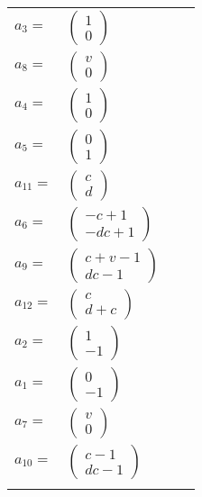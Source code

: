 \documentclass[1p]{elsarticle_modified}
\theoremstyle{definition}
\begin{document}
\begin{tabular}{m{7pt} m{180pt} m{7pt} m{180pt} }
\flushright $a_{3}=$&$\begin{pmatrix}1\\0\end{pmatrix}$ \\
\flushright $a_{8}=$&$\begin{pmatrix}v\\0\end{pmatrix}$ \\
\flushright $a_{4}=$&$\begin{pmatrix}1\\0\end{pmatrix}$ \\
\flushright $a_{5}=$&$\begin{pmatrix}0\\1\end{pmatrix}$ \\
\flushright $a_{11}=$&$\begin{pmatrix}c\\d\end{pmatrix}$ \\
\flushright $a_{6}=$&$\begin{pmatrix}- c+1\\- d c+1\end{pmatrix}$ \\
\flushright $a_{9}=$&$\begin{pmatrix}c+v-1\\d c-1\end{pmatrix}$ \\
\flushright $a_{12}=$&$\begin{pmatrix}c\\d+c\end{pmatrix}$ \\
\flushright $a_{2}=$&$\begin{pmatrix}1\\-1\end{pmatrix}$ \\
\flushright $a_{1}=$&$\begin{pmatrix}0\\-1\end{pmatrix}$ \\
\flushright $a_{7}=$&$\begin{pmatrix}v\\0\end{pmatrix}$ \\
\flushright $a_{10}=$&$\begin{pmatrix}c-1\\d c-1\end{pmatrix}$\\&\end{tabular}
\end{document}
